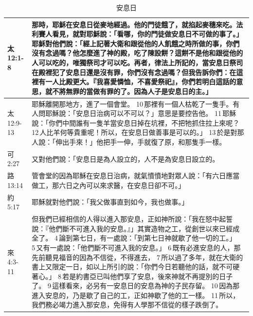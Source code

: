 \begin{table}[H]
\begin{tabular}{p{2cm}|p{14.5cm}}
太12:1-8&那時，耶穌在安息日從麥地經過。他的門徒餓了，就掐起麥穗來吃。法利賽人看見，就對耶穌說：「看哪，你的門徒做安息日不可做的事了。」耶穌對他們說：「經上記著大衛和跟從他的人飢餓之時所做的事，你們沒有念過嗎？他怎麼進了神的殿，吃了陳設餅？這餅不是他和跟從他的人可以吃的，唯獨祭司才可以吃。再者，律法上所記的，當安息日祭司在殿裡犯了安息日還是沒有罪，你們沒有念過嗎？但我告訴你們：在這裡有一人比殿更大。『我喜愛憐恤，不喜愛祭祀』，你們若明白這話的意思，就不將無罪的當做有罪的了。因為人子是安息日的主。」\\\hline


太12:9-13&耶穌離開那地方，進了一個會堂。 10 那裡有一個人枯乾了一隻手。有人問耶穌說：「安息日治病可以不可以？」意思是要控告他。 11 耶穌說：「你們中間誰有一隻羊當安息日掉在坑裡，不把牠抓住拉上來呢？ 12 人比羊何等貴重呢！所以，在安息日做善事是可以的。」 13 於是對那人說：「伸出手來！」他把手一伸，手就復了原，和那隻手一樣。\\\hline


可 2:27&又對他們說：「安息日是為人設立的，人不是為安息日設立的。\\\hline

路 13:14&
管會堂的因為耶穌在安息日治病，就氣憤憤地對眾人說：「有六日應當做工，那六日之內可以來求醫，在安息日卻不可。」\\\hline
約 5:17&耶穌就對他們說：「我父做事直到如今，我也做事。」\\\hline

來 4:3-11&但我們已經相信的人得以進入那安息，正如神所說：「我在怒中起誓說：『他們斷不可進入我的安息。』」其實造物之工，從創世以來已經成全了。 4 論到第七日，有一處說：「到第七日神就歇了他一切的工。」 5 又有一處說：「他們斷不可進入我的安息。」 6 既有必進安息的人，那先前聽見福音的因為不信從，不得進去， 7 所以過了多年，就在大衛的書上又限定一日，如以上所引的說：「你們今日若聽他的話，就不可硬著心。」 8 若是約書亞已叫他們享了安息，後來神就不再提別的日子了。 9 這樣看來，必另有一安息日的安息為神的子民存留。 10 因為那進入安息的，乃是歇了自己的工，正如神歇了他的工一樣。 11 所以，我們務必竭力進入那安息，免得有人學那不信從的樣子跌倒了。\\\hline


\end{tabular}
\caption{安息日}
\end{table}




